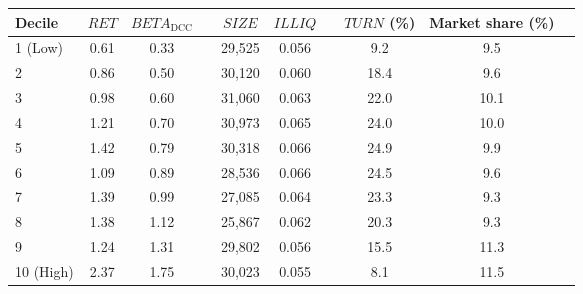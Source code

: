 \begin{tabular}{@{}lccccccccc@{}}
	\toprule
	Decile & $\textit{RET}$ & $\textit{BETA}_\textrm{DCC}$ && $\textit{SIZE}$ & $\textit{ILLIQ}$ && $\textit{TURN}$ (\%) & Market share (\%) \\ \midrule
1 (Low) & 0.61 & 0.33 && 29,525 & 0.056 && 9.2 & 9.5 \\
2       & 0.86 & 0.50 && 30,120 & 0.060 && 18.4 & 9.6 \\
3       & 0.98 & 0.60 && 31,060 & 0.063 && 22.0 & 10.1 \\
4       & 1.21 & 0.70 && 30,973 & 0.065 && 24.0 & 10.0 \\
5       & 1.42 & 0.79 && 30,318 & 0.066 && 24.9 & 9.9 \\
6       & 1.09 & 0.89 && 28,536 & 0.066 && 24.5 & 9.6 \\
7       & 1.39 & 0.99 && 27,085 & 0.064 && 23.3 & 9.3 \\
8       & 1.38 & 1.12 && 25,867 & 0.062 && 20.3 & 9.3 \\
9       & 1.24 & 1.31 && 29,802 & 0.056 && 15.5 & 11.3 \\
10 (High) & 2.37 & 1.75 && 30,023 & 0.055 && 8.1 & 11.5 \\
	\bottomrule
\end{tabular}